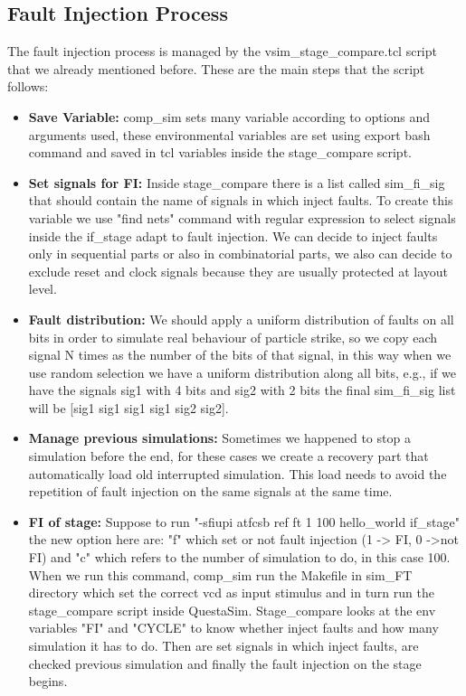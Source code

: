 {{        \subsection{Fault Injection Process}{
            The fault injection process is managed by the vsim\_stage\_compare.tcl script that we already mentioned before. 
            These are the main steps that the script follows:
            \begin{itemize}
                \item \textbf{Save Variable:} comp\_sim sets many variable according to options and arguments used, these environmental variables are set using export bash command and saved in tcl variables inside the stage\_compare script.
                \item \textbf{Set signals for FI:} Inside stage\_compare there is a list called sim\_fi\_sig that should contain the name of signals in which inject faults. To create this variable we use "find nets" command with regular expression to select signals inside the if\_stage adapt to fault injection. We can decide to inject faults only in sequential parts or also in combinatorial parts, we also can decide to exclude reset and clock signals because they are usually protected at layout level.
                \item \textbf{Fault distribution:} We should apply a uniform distribution of faults on all bits in order to simulate real behaviour of particle strike, so we copy each signal N times  as the number of the bits of that signal, in this way when we use random selection we have a uniform distribution along all bits, e.g., if we have the signals sig1 with 4 bits and sig2 with 2 bits the final sim\_fi\_sig list will be [sig1 sig1 sig1 sig1 sig2 sig2]. 
                \item \textbf{Manage previous simulations:} Sometimes we happened to stop a simulation before the end, for these cases we create a recovery part that automatically load old interrupted simulation. This load needs to avoid the repetition of fault injection on the same signals at the same time.
                \item \textbf{FI of stage:} Suppose to run \breakline "-sfiupi atfcsb ref ft 1 100 hello\_world if\_stage" the new option here are: "f" which set or not fault injection (1 -> FI, 0 ->not FI) and "c" which refers to the number of simulation to do, in this case 100.
                When we run this command,  comp\_sim run the Makefile in sim\_FT directory which set the correct vcd as input stimulus and in turn run the stage\_compare script inside QuestaSim. 
                Stage\_compare looks at the env variables "FI" and "CYCLE" to know whether inject faults and how many simulation it has to do.
                Then are set signals in which inject faults, are checked previous simulation and finally the fault injection on the stage begins.\\
                

\end{itemize}}}}
